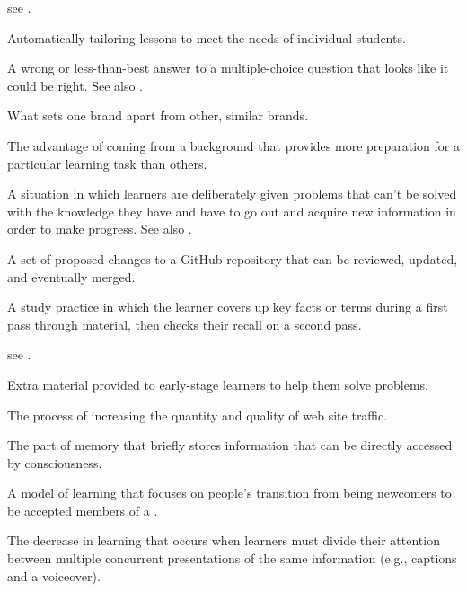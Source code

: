 \begin{description}
 see .

 Automatically tailoring
lessons to meet the needs of individual students.

 A wrong or less-than-best
answer to a multiple-choice question that looks like it could be right. See also
.

 What sets one brand apart from other,
similar brands.

 The advantage of coming
from a background that provides more preparation for a particular learning task
than others.

 A situation in which learners
are deliberately given problems that can't be solved with the knowledge they
have and have to go out and acquire new information in order to make progress.
See also .

 A set of proposed changes to a GitHub
repository that can be reviewed, updated, and eventually merged.

 A study practice in which
the learner covers up key facts or terms during a first pass through material,
then checks their recall on a second pass.

 see .

 Extra material provided to early-stage
learners to help them solve problems.

 The process of increasing the
quantity and quality of web site traffic.

 The part of memory that briefly
stores information that can be directly accessed by consciousness.

 A model of learning that focuses
on people's transition from being newcomers to be accepted members of a
.

 The decrease in
learning that occurs when learners must divide their attention between multiple
concurrent presentations of the same information (e.g., captions and a
voiceover).


\end{description}
